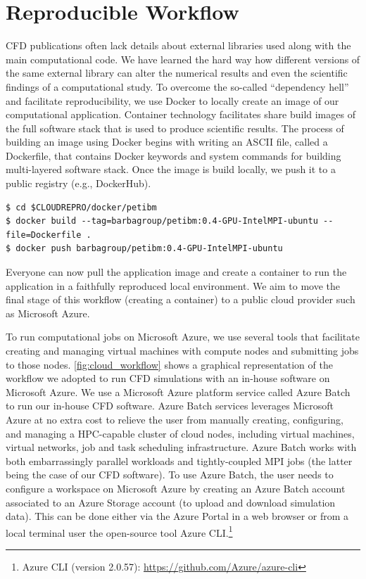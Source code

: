 \documentclass[10pt,journal,compsoc]{IEEEtran}
\begin{document}
\section{Reproducible Workflow}\label{sec:workflow}

CFD publications often lack details about external libraries used along with the main computational code.
We have learned the hard way how different versions of the same external library can alter the numerical results and even the scientific findings of a computational study\cite{mesnard_barba_2017}.
To overcome the so-called ``dependency hell'' and facilitate reproducibility, we use Docker to locally create an image of our computational application.
Container technology facilitates share build images of the full software stack that is used to produce scientific results.
The process of building an image using Docker begins with writing an ASCII file, called a Dockerfile, that contains Docker keywords and system commands for building multi-layered software stack.
Once the image is build locally, we push it to a public registry (e.g., DockerHub).

\clearpage

\begin{lstlisting}[float]
$ cd $CLOUDREPRO/docker/petibm
$ docker build --tag=barbagroup/petibm:0.4-GPU-IntelMPI-ubuntu --file=Dockerfile .
$ docker push barbagroup/petibm:0.4-GPU-IntelMPI-ubuntu
\end{lstlisting}

Everyone can now pull the application image and create a container to run the application in a faithfully reproduced local environment.
We aim to move the final stage of this workflow (creating a container) to a public cloud provider such as Microsoft Azure.

To run computational jobs on Microsoft Azure, we use several tools that facilitate creating and managing virtual machines with compute nodes and submitting jobs to those nodes.
\ref{fig:cloud_workflow} shows a graphical representation of the workflow we adopted to run CFD simulations with an in-house software on Microsoft Azure.
We use a Microsoft Azure platform service called Azure Batch to run our in-house CFD software.
Azure Batch services leverages Microsoft Azure at no extra cost to relieve the user from manually creating, configuring, and managing a HPC-capable cluster of cloud nodes, including virtual machines, virtual networks, job and task scheduling infrastructure.
Azure Batch works with both embarrassingly parallel workloads and tightly-coupled MPI jobs (the latter being the case of our CFD software).
To use Azure Batch, the user needs to configure a workspace on Microsoft Azure by creating an Azure Batch account associated to an Azure Storage account (to upload and download simulation data).
This can be done either via the Azure Portal in a web browser or from a local terminal user the open-source tool Azure CLI.\footnote{Azure CLI (version 2.0.57): \url{https://github.com/Azure/azure-cli}}
\end{document}
